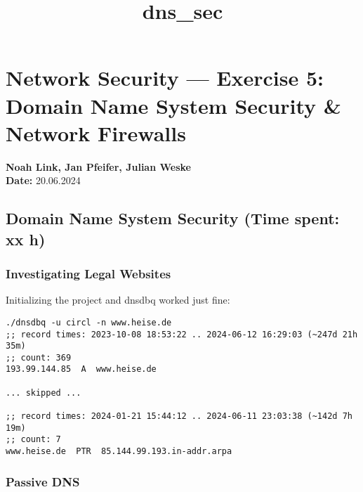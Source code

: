 \documentclass[11pt]{article}
\title{dns\_sec}
\begin{document}
    
    \maketitle
    
    

    
    \hypertarget{network-security-exercise-5-domain-name-system-security-network-firewalls}{%
\section{Network Security --- Exercise 5: Domain Name System Security \&
Network
Firewalls}\label{network-security-exercise-5-domain-name-system-security-network-firewalls}}

\textbf{Noah Link, Jan Pfeifer, Julian Weske}\\
\textbf{Date:} 20.06.2024

    \hypertarget{domain-name-system-security-time-spent-xx-h}{%
\subsection{Domain Name System Security (Time spent: xx
h)}\label{domain-name-system-security-time-spent-xx-h}}

\hypertarget{investigating-legal-websites}{%
\subsubsection{Investigating Legal
Websites}\label{investigating-legal-websites}}

Initializing the project and dnsdbq worked just fine:

\begin{verbatim}
./dnsdbq -u circl -n www.heise.de
;; record times: 2023-10-08 18:53:22 .. 2024-06-12 16:29:03 (~247d 21h 35m)
;; count: 369
193.99.144.85  A  www.heise.de

... skipped ...

;; record times: 2024-01-21 15:44:12 .. 2024-06-11 23:03:38 (~142d 7h 19m)
;; count: 7
www.heise.de  PTR  85.144.99.193.in-addr.arpa
\end{verbatim}

    \hypertarget{passive-dns}{%
\subsubsection{Passive DNS}\label{passive-dns}}
\end{document}
